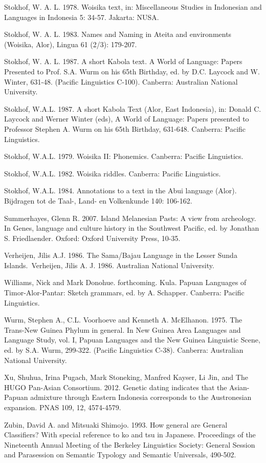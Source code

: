 Stokhof, W. A. L. 1978. Woisika text, in: Miscellaneous Studies in Indonesian and Languages in Indonesia 5: 34-57. Jakarta: NUSA. 

Stokhof, W. A. L. 1983. Names and Naming in Ateita and environments (Woisika, Alor), Lingua 61 (2/3): 179-207.

Stokhof, W. A. L. 1987. A short Kabola text. A World of Language: Papers Presented to Prof. S.A. Wurm on his 65th Birthday, ed. by D.C. Laycock and W. Winter, 631-48. (Pacific Linguistics C-100). Canberra: Australian National University.

Stokhof, W.A.L.  1987. A short Kabola Text (Alor, East Indonesia), in:  Donald C. Laycock  and Werner Winter (eds), A World of Language: Papers presented to Professor Stephen A. Wurm on his 65th Birthday, 631-648. Canberra: Pacific Linguistics.

Stokhof, W.A.L. 1979. Woisika II: Phonemics. Canberra: Pacific Linguistics.

Stokhof, W.A.L. 1982. Woisika riddles. Canberra: Pacific Linguistics.

Stokhof, W.A.L. 1984. Annotations to a text in the Abui language (Alor). Bijdragen tot de Taal-, Land- en Volkenkunde 140: 106-162.

Summerhayes, Glenn R. 2007. Island Melanesian Pasts: A view from archeology. In Genes, language and culture history in the Southwest Pacific, ed. by Jonathan S. Friedlaender. Oxford: Oxford University Press, 10-35.

Verheijen, Jilis A.J. 1986. The Sama/Bajau Language in the Lesser Sunda Islands.~Verheijen, Jilis A. J. 1986. Australian National University.

Williams, Nick and Mark Donohue. forthcoming. Kula. Papuan Languages of Timor-Alor-Pantar: Sketch grammars, ed. by A. Schapper. Canberra: Pacific Linguistics.

Wurm, Stephen A., C.L. Voorhoeve and Kenneth A. McElhanon. 1975. The Trans-New Guinea Phylum in general. In New Guinea Area Languages and Language Study, vol. I, Papuan Languages and the New Guinea Linguistic Scene, ed. by S.A. Wurm, 299-322. (Pacific Linguistics C-38). Canberra: Australian National University.

Xu, Shuhua, Irina Pugach, Mark Stoneking, Manfred Kayser, Li Jin, and The HUGO Pan-Asian Consortium. 2012. Genetic dating indicates that the Asian-Papuan admixture through Eastern Indonesia corresponds to the Austronesian expansion. PNAS 109, 12, 4574-4579.

Zubin, David A. and Mitsuaki Shimojo. 1993. How general are General Classifiers? With special reference to ko and tsu in Japanese. Proceedings of the Nineteenth Annual  Meeting of the Berkeley Linguistics Society: General Session and Parasession on Semantic Typology and Semantic Universals, 490-502.

